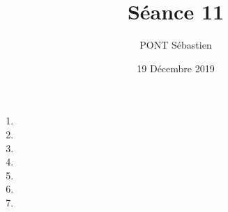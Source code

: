 \documentclass{sebaClass}
\title{Séance 11}
\author{PONT Sébastien}
\date{19 Décembre 2019}
\begin{document}
\maketitle
\begin{enumerate}
  \item 
  \item 
  \item 
  \item 
  \item 
  \item 
  \item 
\end{enumerate}
\end{document}
